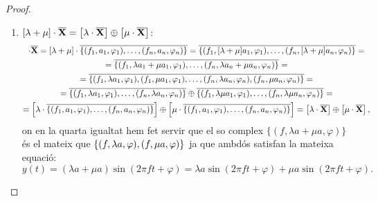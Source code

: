 \documentclass{article}
\theoremstyle{math}
\newcommand{\0}{\ensuremath{\vb{0}}}
\newcommand{\X}{\ensuremath{\vb{X}}}
\begin{document}
\begin{proof}
\begin{enumerate}
        \item $[\lambda+\mu]\cdot \overline{\X}=\left[\lambda \cdot \overline{\X}\right] \oplus\left[\mu \cdot \overline{\X}\right]$:
        \begin{multline*}
            [\lambda+\mu]\cdot \overline{\X}=[\lambda+\mu]\cdot\overline{\{(f_1,a_1,\varphi_1),\ldots,(f_n,a_n,\varphi_n)\}}=\overline{\{(f_1,[\lambda+\mu]a_1,\varphi_1),\ldots,(f_n,[\lambda+\mu]a_n,\varphi_n)\}}=\\=\overline{\{(f_1,\lambda a_1+\mu a_1,\varphi_1),\ldots,(f_n,\lambda a_n+\mu a_n,\varphi_n)\}}=\\=\overline{\{(f_1,\lambda a_1,\varphi_1),(f_1,\mu a_1,\varphi_1),\ldots,(f_n,\lambda a_n,\varphi_n),(f_n,\mu a_n,\varphi_n)\}}=\\=\overline{\{(f_1,\lambda a_1,\varphi_1),\ldots,(f_n,\lambda a_n,\varphi_n)\}}\oplus\overline{\{(f_1,\lambda\mu a_1,\varphi_1),\ldots,(f_n,\lambda\mu a_n,\varphi_n)\}}=\\=\left[\lambda\cdot\overline{\{(f_1,a_1,\varphi_1),\ldots,(f_n,a_n,\varphi_n)\}}\right]\oplus\left[\mu\cdot\overline{\{(f_1,a_1,\varphi_1),\ldots,(f_n,a_n,\varphi_n)\}}\right]=\left[\lambda \cdot \overline{\X}\right] \oplus\left[\mu \cdot \overline{\X}\right],
        \end{multline*}
        on en la quarta igualtat hem fet servir que el so complex $\{(f,\lambda a+\mu a,\varphi)\}$ és el mateix que $\{(f,\lambda a,\varphi),\\(f,\mu a,\varphi)\}$ ja que ambdós satisfan la mateixa equació: $$y(t)=(\lambda a+\mu a)\sin(2\pi ft+\varphi)=\lambda a\sin(2\pi ft+\varphi)+\mu a\sin(2\pi ft+\varphi).$$
    \end{enumerate}
\end{proof}
\end{document}
